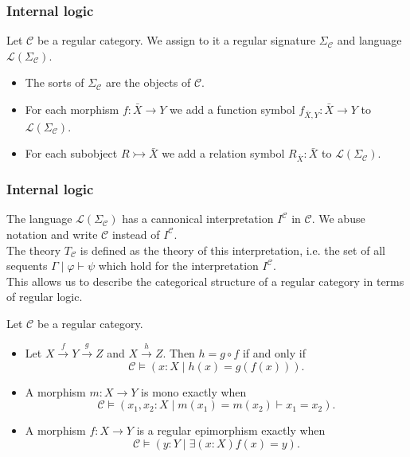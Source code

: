 \documentclass[14pt]{beamer}
\theoremstyle{plain}
\begin{document}
  \begin{frame}
    \frametitle{Internal logic}
    Let $\mathcal{C}$ be a regular category. \pause
    We assign to it a regular signature
    $\Sigma_{\mathcal{C}}$ and language $\mathcal{L}(\Sigma_{\mathcal{C}})$.
    \pause
    \vspace{1em}
    \begin{itemize}
      \item The sorts of $\Sigma_{\mathcal{C}}$ are the objects of $\mathcal{C}$.
      \pause
      \vspace{1em}
      \item For each morphism $f : \bar{X} \to Y$ we add a function symbol
        $f_{\bar{X},Y} : \bar{X} \to Y$ to $\mathcal{L}(\Sigma_{\mathcal{C}})$.
      \pause
      \vspace{1em}
      \item For each subobject $R \rightarrowtail \bar{X}$ we add a relation symbol
        $R_{\bar{X}} : \bar{X}$ to $\mathcal{L}(\Sigma_{\mathcal{C}})$.
    \end{itemize}
  \end{frame}

  \begin{frame}
    \frametitle{Internal logic}
    The language $\mathcal{L}(\Sigma_{\mathcal{C}})$ has a cannonical interpretation
    $I^{\mathcal{C}}$ in $\mathcal{C}$. We abuse notation and write $\mathcal{C}$
    instead of $I^{\mathcal{C}}$.
    \vspace{1em}
    \pause \\
    The theory $T_{\mathcal{C}}$ is defined as the theory of this interpretation\pause ,
    i.e. the set of all sequents $\Gamma \mid \varphi \vdash \psi$ which hold for
    the interpretation $I^{\mathcal{C}}$.
    \vspace{1em}
    \pause \\
    This allows us to describe the categorical structure of a regular category in
    terms of regular logic.
  \end{frame}

  \begin{frame}
    \begin{lemma}
      Let $\mathcal{C}$ be a regular category.
      \begin{itemize}
      \item<2-> Let $X \xrightarrow{f} Y \xrightarrow{g} Z$ and
        $X \xrightarrow{h} Z$.  Then $h = g \circ f$
        if and only if
        \[{\mathcal{C} \models (x:X \mid  h(x) = g(f(x)))}.\]
      \item<3-> A morphism $m : X \to Y$ is mono exactly when
        \[\mathcal{C} \models (x_1,x_2:X \mid m(x_1) = m(x_2) \vdash x_1 = x_2). \]
      \item<4-> A morphism $f : X \to Y$ is a regular epimorphism exactly when
        \[ \mathcal{C} \models (y:Y \mid \exists (x:X) f(x) = y). \]
      \end{itemize}
    \end{lemma}
  \end{frame}
\end{document}
